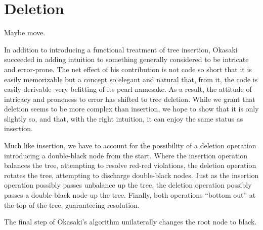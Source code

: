 \documentclass[preprint]{sigplanconf}
\begin{document}


\section{Deletion}

Maybe move.

In addition to introducing a functional treatment of tree insertion, Okasaki succeeded in adding intuition to something generally considered to be intricate and error-prone. The net effect of his contribution is not code so short that it is easily memorizable but a concept so elegant and natural that, from it, the code is easily derivable--very befitting of its pearl namesake. As a result, the attitude of intricacy and proneness to error has shifted to tree deletion. While we grant that deletion seems to be more complex than insertion, we hope to show that it is only slightly so, and that, with the right intuition, it can enjoy the same status as insertion.




Much like insertion, we have to account for the possibility of a deletion operation introducing a double-black node from the start. Where the insertion operation balances the tree, attempting to resolve red-red violations, the deletion operation rotates the tree, attempting to discharge double-black nodes. Just as the insertion operation possibly passes unbalance up the tree, the deletion operation possibly passes a double-black node up the tree. Finally, both operations ``bottom out'' at the top of the tree, guaranteeing resolution.

The final step of Okasaki's algorithm unilaterally changes the root node to black. 
\end{document}
